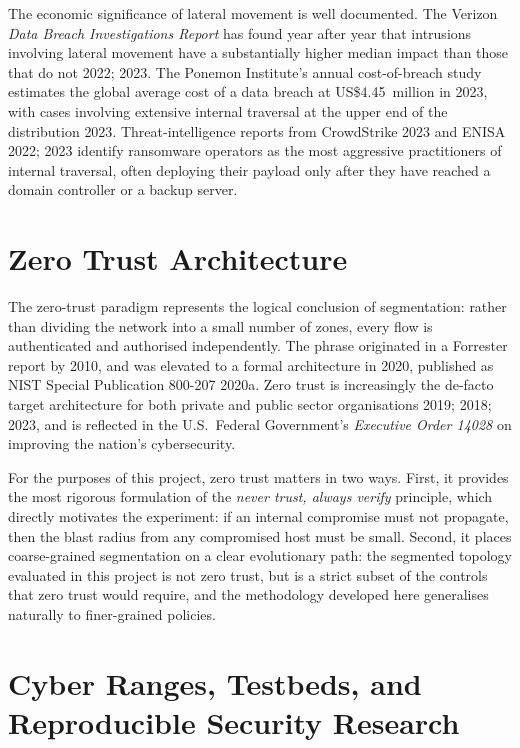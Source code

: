 The economic significance of lateral movement is well documented. The Verizon \emph{Data Breach Investigations Report} has found year after year that intrusions involving lateral movement have a substantially higher median impact than those that do not \parencite{Verizon}{2022}; \parencite{Verizon}{2023}. The Ponemon Institute's annual cost-of-breach study estimates the global average cost of a data breach at US\$4.45~million in 2023, with cases involving extensive internal traversal at the upper end of the distribution \parencite{Ponemon Institute}{2023}. Threat-intelligence reports from CrowdStrike \parencite{CrowdStrike}{2023} and ENISA \parencite{ENISA}{2022}; \parencite{ENISA}{2023} identify ransomware operators as the most aggressive practitioners of internal traversal, often deploying their payload only after they have reached a domain controller or a backup server.

\section{Zero Trust Architecture}

The zero-trust paradigm represents the logical conclusion of segmentation: rather than dividing the network into a small number of zones, every flow is authenticated and authorised independently. The phrase originated in a Forrester report by \textcite{Kindervag}{2010}, and was elevated to a formal architecture in \textcite{Rose et al.}{2020}, published as NIST Special Publication 800-207 \parencite{NIST}{2020a}. Zero trust is increasingly the de-facto target architecture for both private and public sector organisations \parencite{Gartner}{2019}; \parencite{Forrester}{2018}; \parencite{Microsoft}{2023}, and is reflected in the U.S.\ Federal Government's \textit{Executive Order 14028} on improving the nation's cybersecurity.

For the purposes of this project, zero trust matters in two ways. First, it provides the most rigorous formulation of the \emph{never trust, always verify} principle, which directly motivates the experiment: if an internal compromise must not propagate, then the blast radius from any compromised host must be small. Second, it places coarse-grained segmentation on a clear evolutionary path: the segmented topology evaluated in this project is not zero trust, but is a strict subset of the controls that zero trust would require, and the methodology developed here generalises naturally to finer-grained policies.

\section{Cyber Ranges, Testbeds, and Reproducible Security Research}

